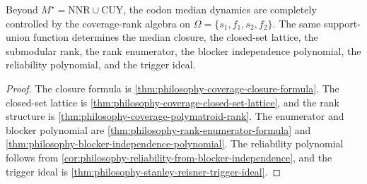 \begin{theorem}
\label{thm:philosophy-coverage-rank-algebra-theorem}
Beyond $M^{\star}=\mathrm{NNR}\cup\mathrm{CUY}$, the codon median
dynamics are completely controlled by the coverage-rank algebra on
$\Omega=\{s_{1},f_{1},s_{2},f_{2}\}$. The same support-union function
determines the median closure, the closed-set lattice, the submodular
rank, the rank enumerator, the blocker independence polynomial, the
reliability polynomial, and the trigger ideal.
\end{theorem}
\begin{proof}
The closure formula is
\autoref{thm:philosophy-coverage-closure-formula}. The closed-set
lattice is \autoref{thm:philosophy-coverage-closed-set-lattice}, and
the rank structure is \autoref{thm:philosophy-coverage-polymatroid-rank}.
The enumerator and blocker polynomial are
\autoref{thm:philosophy-rank-enumerator-formula} and
\autoref{thm:philosophy-blocker-independence-polynomial}. The
reliability polynomial follows from
\autoref{cor:philosophy-reliability-from-blocker-independence}, and the
trigger ideal is \autoref{thm:philosophy-stanley-reisner-trigger-ideal}.
\end{proof}
